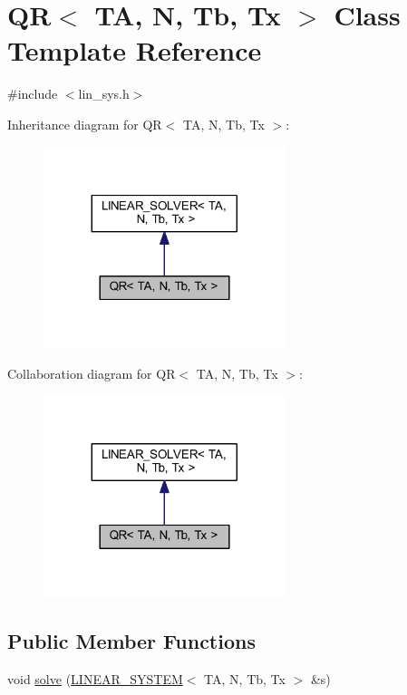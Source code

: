 \hypertarget{class_q_r}{}\section{QR$<$ TA, N, Tb, Tx $>$ Class Template Reference}
\label{class_q_r}


{\ttfamily \#include $<$lin\+\_\+sys.\+h$>$}



Inheritance diagram for QR$<$ TA, N, Tb, Tx $>$\+:\nopagebreak
\begin{figure}[H]
\begin{center}
\leavevmode
\includegraphics[width=200pt]{class_q_r__inherit__graph}
\end{center}
\end{figure}


Collaboration diagram for QR$<$ TA, N, Tb, Tx $>$\+:\nopagebreak
\begin{figure}[H]
\begin{center}
\leavevmode
\includegraphics[width=200pt]{class_q_r__coll__graph}
\end{center}
\end{figure}
\subsection*{Public Member Functions}
\begin{DoxyCompactItemize}
\item 
void \mbox{\hyperlink{class_q_r_ab8f49cec36214bdcd9fca78e89c3737e}{solve}} (\mbox{\hyperlink{class_l_i_n_e_a_r___s_y_s_t_e_m}{L\+I\+N\+E\+A\+R\+\_\+\+S\+Y\+S\+T\+EM}}$<$ TA, N, Tb, Tx $>$ \&s)
\end{DoxyCompactItemize}



